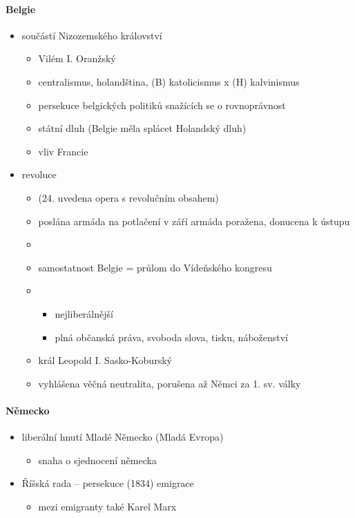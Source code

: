 \paragraph{Belgie}
\begin{itemize}
\item součástí Nizozemského království
	\begin{itemize}
	\item Vilém I. Oranžský
	\item centralismus, holandština, (B) katolicismus x (H) kalvinismus
	\item persekuce belgických politiků snažících se o rovnoprávnost
	\item státní dluh (Belgie měla splácet Holandský dluh)
	\item vliv Francie
	\end{itemize}


\item[\ra] revoluce
\begin{itemize}
\item {} (24. uvedena opera s revolučním obsahem)
\item poslána armáda na potlačení \ra v září armáda poražena, donucena k ústupu
\item {}
\item samostatnost Belgie = průlom do Vídeňského kongresu
\item {}
	\begin{itemize}
	\item nejliberálnější 
	\item plná občanská práva, svoboda slova, tisku, náboženství
	\end{itemize}
\item král Leopold I. Sasko-Koburský
\item vyhlášena věčná neutralita, porušena až Němci za 1. sv. války
\end{itemize}
\end{itemize}

\paragraph{Německo}
\begin{itemize}
\item liberální hnutí Mladé Německo (Mladá Evropa)
	\begin{itemize}
	\item snaha o sjednocení německa
	\end{itemize}
\item[\ra] Říšská rada -- persekuce (1834) \ra emigrace
	\begin{itemize}
	\item mezi emigranty také Karel Marx
	\end{itemize}
\end{itemize}


